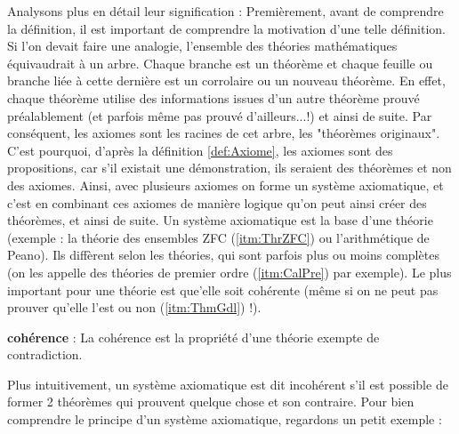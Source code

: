 Analysons plus en détail leur signification : \newline
Premièrement, avant de comprendre la définition, il est important de comprendre la motivation d'une telle définition. \newline
Si l'on devait faire une analogie, l'ensemble des théories mathématiques équivaudrait à un arbre. Chaque branche est un théorème et chaque feuille ou branche liée à cette dernière est un corrolaire ou un nouveau théorème. \newline
En effet, chaque théorème utilise des informations issues d'un autre théorème prouvé préalablement (et parfois même pas prouvé d'ailleurs...!) et ainsi de suite. \newline
Par conséquent, les axiomes sont les racines de cet arbre, les "théorèmes originaux". \newline
C'est pourquoi, d'après la définition \ref{def:Axiome}, les axiomes sont des propositions, car s'il existait une démonstration, ils seraient des théorèmes et non des axiomes. \newline
\newline
Ainsi, avec plusieurs axiomes on forme un système axiomatique, et c'est en combinant ces axiomes de manière logique qu'on peut ainsi créer des théorèmes, et ainsi de suite. \newline
Un système axiomatique est la base d'une théorie (exemple : la théorie des ensembles ZFC (\ref{itm:ThrZFC}) ou l'arithmétique de Peano). Ils diffèrent selon les théories, qui sont parfois plus ou moins complètes (on les appelle des théories de premier ordre (\ref{itm:CalPre}) par exemple). \newline
Le plus important pour une théorie est que'elle soit cohérente (même si on ne peut pas prouver qu'elle l'est ou non (\ref{itm:ThmGdl}) !).

\begin{definition}
\textbf{cohérence} : \newline
La cohérence est la propriété d'une théorie exempte de contradiction.
\end{definition}

Plus intuitivement, un système axiomatique est dit incohérent s'il est possible de former 2 théorèmes qui prouvent quelque chose et son contraire. \newline
Pour bien comprendre le principe d'un système axiomatique, regardons un petit exemple :

